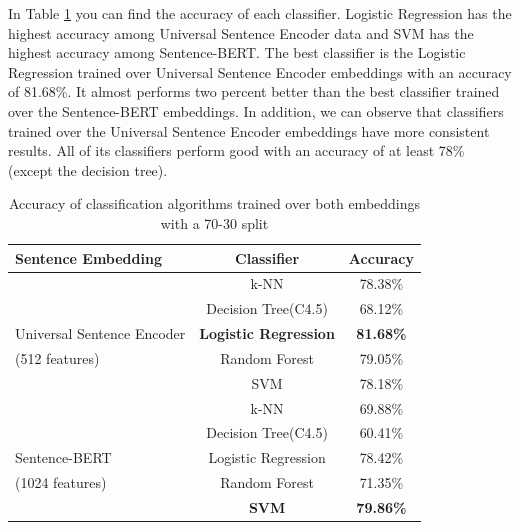 \documentclass[conference]{IEEEtran}
\begin{document}
In Table \ref{tab:results} you can find the accuracy of each classifier. Logistic Regression has the 
highest accuracy among Universal Sentence Encoder data and SVM has the highest accuracy among 
Sentence-BERT. The best classifier is the Logistic Regression trained over Universal Sentence Encoder 
embeddings with an accuracy of 81.68\%. It almost performs two percent better than the best classifier 
trained over the Sentence-BERT embeddings. In addition, we can observe that classifiers trained over 
the Universal Sentence Encoder embeddings have more consistent results. All of its classifiers  
perform good with an accuracy of at least 78\% (except the decision tree). 

\begin{table}[t]
  \caption{Accuracy of classification algorithms trained over both embeddings with a 70-30 split}
  \begin{center}
  \begin{tabular}{|l|c|c|}
  \hline
  \textbf{Sentence Embedding} & \textbf{Classifier}&\textbf{Accuracy}\\
  \hline
                            &k-NN                & 78.38\% \\
                            &Decision Tree(C4.5) & 68.12\% \\
  Universal Sentence Encoder&\textbf{Logistic Regression} & \textbf{81.68\%} \\
  (512 features)            &Random Forest       & 79.05\% \\
                            &SVM                 & 78.18\% \\
  \hline
               &k-NN                & 69.88\% \\
               &Decision Tree(C4.5) & 60.41\% \\
  Sentence-BERT&Logistic Regression & 78.42\% \\
  (1024 features)&Random Forest     & 71.35\% \\
               &\textbf{SVM}        & \textbf{79.86\%}\\
\hline
  \end{tabular}
  \end{center}
  \label{tab:results}
\end{table}
\end{document}
